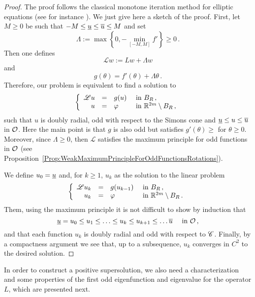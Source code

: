 \begin{proof}
	The proof follows the classical monotone iteration method for elliptic equations (see for instance \cite{Evans}). We just give here a sketch of the proof. 
	First, let $M \geq 0$ be such that $-M \leq \underline{u} \leq \overline{u} \leq M$ and set
	$$
	\Lambda := \max \left \{{0, - \min_{[-M,M]}f'}\right \}\geq 0\,.
	$$
	Then one defines 
	$$
	\mathscr{L}w := Lw + \Lambda w
	$$
	and
	$$
	g(\theta) = f'(\theta) + \Lambda \theta\,.
	$$
	Therefore, our problem is equivalent to find a solution to
	$$
	\left\{\begin{array}{rcll}
	\mathscr{L}u & = & g(u) & \textrm{ in } B_R\,, \\
	u &=& \varphi &  \textrm{ in } \mathbb{R}^{2m} \setminus B_R\,, 
	\end{array} \right.
	$$
	such that $u$ is doubly radial, odd with respect to the Simons cone and  $\underline{u} \leq u \leq \overline{u}$ in $\mathcal{O}$. Here the main point is that $g$ is also odd but satisfies $g'(\theta) \geq $ for $\theta \geq 0$. Moreover, since $\Lambda \geq 0$, then $\mathscr{L}$ satisfies the maximum principle for odd functions in $\mathcal{O}$ (see Proposition~\ref{Prop:WeakMaximumPrincipleForOddFunctionsRotations}).
	
	We define $u_0 = \underline{u}$ and, for $k\geq 1$, $u_k$ as the solution to the linear problem
	$$
	\left\{\begin{array}{rcll}
	\mathscr{L}u_k & = & g(u_{k-1}) & \textrm{ in } B_R\,, \\
	u_k &=& \varphi &  \textrm{ in } \mathbb{R}^{2m} \setminus B_R\,. 
	\end{array} \right.
	$$
	Them, using the maximum principle it is not difficult to show by induction that 
	$$
	\underline{u} = u_0 \leq u_1 \leq \ldots \leq u_k \leq u_{k+1} \leq \ldots \overline{u} \quad \text{ in }\mathcal{O}\,,
	$$
	and that each function $u_k$ is doubly radial and odd with respect to $\mathscr{C}$. Finally, by a compactness argument we see that, up to a subsequence, $u_k$ converges in $C^2$ to the desired solution.
\end{proof}

In order to construct a positive supersolution, we also need a characterization and some properties of the first odd eigenfunction and eigenvalue for the operator $L$, which are presented next.

